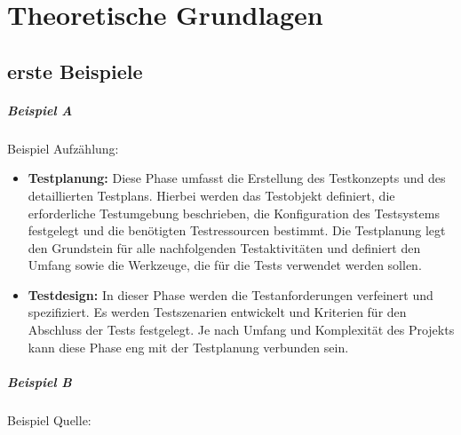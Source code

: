 \chapter{Theoretische Grundlagen}

\section{erste Beispiele}

\paragraph{Beispiel A}

Beispiel Aufzählung:
\begin{itemize}
    \item \textbf{Testplanung:} Diese Phase umfasst die Erstellung des Testkonzepts und des detaillierten Testplans. Hierbei werden das Testobjekt definiert, die erforderliche Testumgebung beschrieben, die Konfiguration des Testsystems festgelegt und die benötigten Testressourcen bestimmt. Die Testplanung legt den Grundstein für alle nachfolgenden Testaktivitäten und definiert den Umfang sowie die Werkzeuge, die für die Tests verwendet werden sollen.
    \item \textbf{Testdesign:} In dieser Phase werden die Testanforderungen verfeinert und spezifiziert. Es werden Testszenarien entwickelt und Kriterien für den Abschluss der Tests festgelegt. Je nach Umfang und Komplexität des Projekts kann diese Phase eng mit der Testplanung verbunden sein.
\end{itemize}

\paragraph{Beispiel B}

Beispiel Quelle: \citep{Witte2019} \citep{Witte2023}